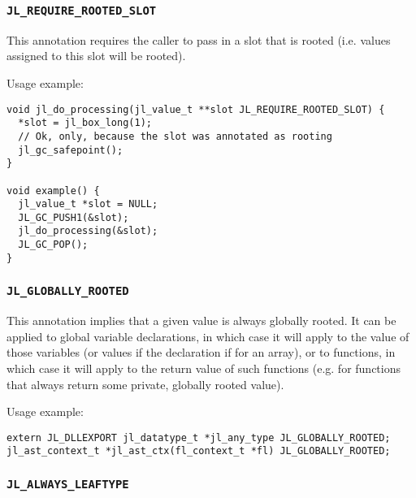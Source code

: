 \hypertarget{14120380498342272328}{}


\subsubsection{\texttt{JL\_REQUIRE\_ROOTED\_SLOT}}



This annotation requires the caller to pass in a slot that is rooted (i.e. values assigned to this slot will be rooted).



Usage example:




\begin{lstlisting}
void jl_do_processing(jl_value_t **slot JL_REQUIRE_ROOTED_SLOT) {
  *slot = jl_box_long(1);
  // Ok, only, because the slot was annotated as rooting
  jl_gc_safepoint();
}

void example() {
  jl_value_t *slot = NULL;
  JL_GC_PUSH1(&slot);
  jl_do_processing(&slot);
  JL_GC_POP();
}
\end{lstlisting}



\hypertarget{11329720779284449718}{}


\subsubsection{\texttt{JL\_GLOBALLY\_ROOTED}}



This annotation implies that a given value is always globally rooted. It can be applied to global variable declarations, in which case it will apply to the value of those variables (or values if the declaration if for an array), or to functions, in which case it will apply to the return value of such functions (e.g. for functions that always return some private, globally rooted value).



Usage example:




\begin{lstlisting}
extern JL_DLLEXPORT jl_datatype_t *jl_any_type JL_GLOBALLY_ROOTED;
jl_ast_context_t *jl_ast_ctx(fl_context_t *fl) JL_GLOBALLY_ROOTED;
\end{lstlisting}



\hypertarget{503057295712361449}{}


\subsubsection{\texttt{JL\_ALWAYS\_LEAFTYPE}}



